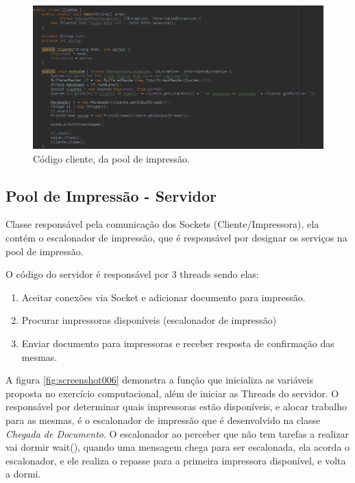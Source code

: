 \documentclass[12pt]{article}
\begin{document}
\begin{figure}[H]
	\centering
	\includegraphics[width=1\linewidth]{imagens/screenshot005}
	\caption{Código cliente, da pool de impressão.}
	\label{fig:screenshot005}
\end{figure}



\subsection{Pool de Impressão - Servidor}\label{pool}
  Classe responsável pela comunicação dos Sockets (Cliente/Impressora), ela contém o escalonador  de impressão, que  é responsável por designar os serviços na pool de impressão.
  
	  O código do servidor é responsável por 3 threads sendo elas:
	  \begin{enumerate}
	  	\item Aceitar conexões via Socket e adicionar documento para impressão.
	  	\item Procurar impressoras disponíveis (escalonador de impressão)
	  	\item Enviar documento para impressoras e receber resposta de confirmação das mesmas.
	  \end{enumerate}
	
	A figura \ref{fig:screenshot006} demonstra a função que inicializa as variáveis proposta no exercício computacional, além de iniciar as Threads do servidor. 
O responsável por determinar quais impressoras estão disponíveis, e alocar trabalho para as mesmas, é o escalonador de impressão que é desenvolvido na classe \textit{Chegada de Documento}.
O escalonador ao perceber que não tem tarefas a realizar vai dormir wait(), quando uma mensagem chega para ser escalonada, ela acorda o escalonador, e ele realiza o repasse para a primeira impressora disponível, e volta a dormi.
\end{document}
